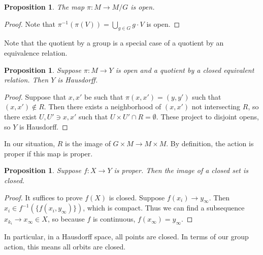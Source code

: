 \documentclass[leqno, openany]{memoir}
\newtheorem{prop}[thm]{Proposition}
\theoremstyle{definition}
\theoremstyle{remark}
\theoremstyle{plain}
\theoremstyle{definition}
\theoremstyle{remark}
\begin{document}
\begin{prop}
    The map $\pi: M \to M/G$ is open.
\end{prop}

\begin{proof}
    Note that $\pi^{-1}(\pi(V)) = \bigcup_{g \in G} g \cdot V$ is open.
\end{proof}

Note that the quotient by a group is a special case of a quotient by an equivalence relation.

\begin{prop}
    Suppose $\pi: M \to Y$ is open and a quotient by a closed equivalent relation. Then $Y$ is Hausdorff.
\end{prop}

\begin{proof}
    Suppose that $x,x'$ be such that $\pi(x,x') = (y,y')$ such that $(x,x') \notin R$. Then there exists a neighborhood of $(x,x')$ not intersecting $R$, so there exist $U,U' \ni x,x'$ such that $U \times U' \cap R = \emptyset$. These project to disjoint opens, so $Y$ is Hausdorff.
\end{proof}

In our situation, $R$ is the image of $G \times M \to M \times M$. By definition, the action is proper if this map is proper.

\begin{prop}
    Suppose $f: X \to Y$ is proper. Then the image of a closed set is closed.
\end{prop}

\begin{proof}
    It suffices to prove $f(X)$ is closed. Suppose $f(x_i) \to y_{\infty}$. Then $x_i \in f^{-1}(\{ f(x_i, y_{\infty}) \})$, which is compact. Thus we can find a subsequence $x_{k_i} \to x_{\infty} \in X$, so because $f$ is continuous, $f(x_{\infty}) = y_{\infty}$.
\end{proof}

In particular, in a Hausdorff space, all points are closed. In terms of our group action, this means all orbits are closed.
\end{document}
